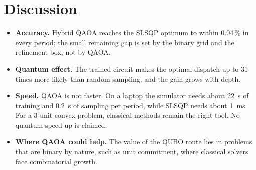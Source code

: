 \section{Discussion}
\begin{itemize}
\item \textbf{Accuracy.} Hybrid QAOA reaches the SLSQP optimum to within 0.04\,\% in every period; the small remaining gap is set by the binary grid and the refinement box, not by QAOA.
\item \textbf{Quantum effect.} The trained circuit makes the optimal dispatch up to 31 times more likely than random sampling, and the gain grows with depth.
\item \textbf{Speed.} QAOA is not faster. On a laptop the simulator needs about 22~s of training and 0.2~s of sampling per period, while SLSQP needs about 1~ms. For a 3-unit convex problem, classical methods remain the right tool. No quantum speed-up is claimed.
\item \textbf{Where QAOA could help.} The value of the QUBO route lies in problems that are binary by nature, such as unit commitment, where classical solvers face combinatorial growth.
\end{itemize}
